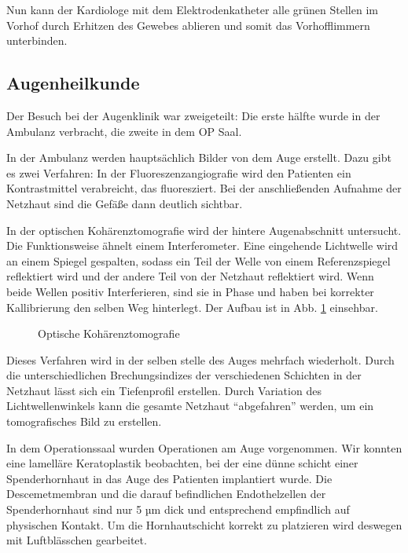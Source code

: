 \documentclass[11pt,a4paper,titlepage]{scrartcl}
\begin{document}
Nun kann der Kardiologe mit dem Elektrodenkatheter alle grünen Stellen im Vorhof durch Erhitzen des Gewebes ablieren und somit das Vorhofflimmern unterbinden.



\subsection{Augenheilkunde}

Der Besuch bei der Augenklinik war zweigeteilt: Die erste hälfte wurde in der Ambulanz verbracht, die zweite in dem OP Saal. \medskip

In der Ambulanz werden hauptsächlich Bilder von dem Auge erstellt. Dazu gibt es zwei Verfahren: In der Fluoreszenzangiografie wird den Patienten ein Kontrastmittel verabreicht, das fluoresziert. Bei der anschließenden Aufnahme der Netzhaut sind die Gefäße dann deutlich sichtbar. \medskip

In der optischen Kohärenztomografie wird der hintere Augenabschnitt untersucht. Die Funktionsweise ähnelt einem Interferometer. Eine eingehende Lichtwelle wird an einem Spiegel gespalten, sodass ein Teil der Welle von einem Referenzspiegel reflektiert wird und der andere Teil von der Netzhaut reflektiert wird. Wenn beide Wellen positiv Interferieren, sind sie in Phase und haben bei korrekter Kallibrierung den selben Weg hinterlegt. Der Aufbau ist in Abb. \ref{fig:kohärenz} einsehbar.

\begin{figure}%
    \centering
    \qquad
    \caption{Optische Kohärenztomografie}%
    \label{fig:kohärenz}%
\end{figure}

Dieses Verfahren wird in der selben stelle des Auges mehrfach wiederholt. Durch die unterschiedlichen Brechungsindizes der verschiedenen Schichten in der Netzhaut lässt sich ein Tiefenprofil erstellen. Durch Variation des Lichtwellenwinkels kann die gesamte Netzhaut \enquote{abgefahren} werden, um ein tomografisches Bild zu erstellen. \medskip

In dem Operationssaal wurden Operationen am Auge vorgenommen. Wir konnten eine lamelläre Keratoplastik beobachten, bei der eine dünne schicht einer Spenderhornhaut in das Auge des Patienten implantiert wurde.  \medskip
Die Descemetmembran und die darauf befindlichen Endothelzellen der Spenderhornhaut sind nur 5 µm dick und entsprechend empfindlich auf physischen Kontakt. Um die Hornhautschicht korrekt zu platzieren wird deswegen mit Luftblässchen gearbeitet.
\end{document}
